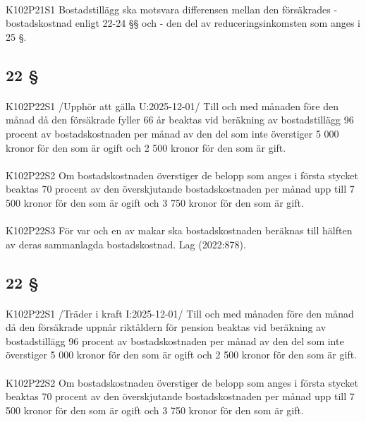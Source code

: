 \documentclass[a4paper,notitlepage,openany,10pt]{book}
\begin{document}
\paragraph*{}
{\tiny K102P21S1}
Bostadstillägg ska motsvara differensen mellan den försäkrades
\newline - bostadskostnad enligt 22-24 §§ och
\newline - den del av reduceringsinkomsten som anges i 25 §.
\subsection*{22 §}
\paragraph*{}
{\tiny K102P22S1}
/Upphör att gälla U:2025-12-01/
Till och med månaden före den månad då den försäkrade fyller 66 år beaktas vid beräkning av bostadstillägg 96 procent av bostadskostnaden per månad av den del som inte överstiger 5 000 kronor för den som är ogift och 2 500 kronor för den som är gift.
\paragraph*{}
{\tiny K102P22S2}
Om bostadskostnaden överstiger de belopp som anges i första stycket beaktas 70 procent av den överskjutande bostadskostnaden per månad upp till 7 500 kronor för den som är ogift och 3 750 kronor för den som är gift.
\paragraph*{}
{\tiny K102P22S3}
För var och en av makar ska bostadskostnaden beräknas till hälften av deras sammanlagda bostadskostnad.
Lag (2022:878).
\subsection*{22 §}
\paragraph*{}
{\tiny K102P22S1}
/Träder i kraft I:2025-12-01/
Till och med månaden före den månad då den försäkrade uppnår riktåldern för pension beaktas vid beräkning av bostadstillägg 96 procent av bostadskostnaden per månad av den del som inte överstiger 5 000 kronor för den som är ogift och 2 500 kronor för den som är gift.
\paragraph*{}
{\tiny K102P22S2}
Om bostadskostnaden överstiger de belopp som anges i första stycket beaktas 70 procent av den överskjutande bostadskostnaden per månad upp till 7 500 kronor för den som är ogift och 3 750 kronor för den som är gift.
\end{document}
